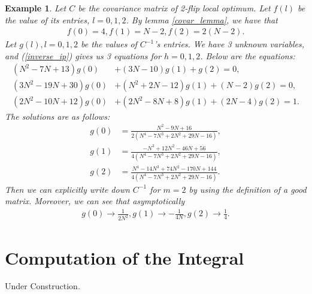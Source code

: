 \documentclass[10pt]{article}
\newtheorem{example}{\bf Example}
\newenvironment{Proof of lemma}{\noindent{\bf Proof of Lemma}}{\hfill$\Box$\newline}
\newenvironment{Proof of claim}{\noindent{\bf Proof of claim}}{\hfill$\Box$\newline}
\newenvironment{Proof of theorem}{\noindent{\bf Proof of Theorem}}{\hfill\scriptsize{$\Box$}\newline}
\newenvironment{Proof of theorems}{\noindent{\bf Proof of Theorems}}{\hfill$\Box$\newline}
\newenvironment{Proof of proposition}{\noindent{\bf Proof of Proposition}}{\hfill$\Box$\newline}
\newenvironment{Proof of propositions}{\noindent{\bf Proof of Propositions}}{\hfill$\Box$\newline}
\newenvironment{Proof of exercise}{\noindent{\it Proof of Exercise:}}{\hfill$\Box$}
\numberwithin{equation}{section}
\begin{document}
\begin{example}
    Let $C$ be the covariance matrix of 2-flip local optimum. Let $f(l)$ be the value of its entries, $l = 0,1,2$. By lemma \ref{covar_lemma}, we have that 
    \begin{align}
        f(0) = 4, f(1) = N-2, f(2)=2(N-2).
    \end{align}
    Let $g(l), l=0,1,2$ be the values of $C^{-1}$'s entries. We have 3 unknown variables, and (\ref{inverse_ip}) gives us 3 equations for $h = 0,1,2$. Below are the equations:
    \begin{align}
        (N^2-7N+13)g(0)&       +(3N-10)g(1)+      g(2)=0, \nonumber \\
        (3N^2-19N+30)g(0)& +(N^2+2N-12)g(1)+ (N-2)g(2)=0, \nonumber \\
        (2N^2-10N+12)g(0)& +(2N^2-8N+8)g(1)+ (2N-4)g(2)=1.
    \end{align}
    The solutions are as follows:
    \begin{align}
        g(0) &= \frac{N^2-9N+16}{2(N^4-7N^3+2N^2+29N-16)}, \nonumber \\
        g(1) &= \frac{-N^3+12N^2-46N+56}{4(N^4-7N^3+2N^2+29N-16)}, \nonumber \\
        g(2) &= \frac{N^4-14N^3+74N^2-170N+144}{4(N^4-7N^3+2N^2+29N-16)}.
    \end{align}
    Then we can explicitly write down $C^{-1}$ for $m=2$ by using the definition of a good matrix. Moreover, we can see that asymptotically
    \begin{align}
        g(0) \to \frac{1}{2N^2}, g(1) \to -\frac{1}{4N}, g(2) \to \frac{1}{4}.
    \end{align}
\end{example}
\section{Computation of the Integral} \label{sec_integral}
Under Construction.

\nocite{*}

\end{document}
